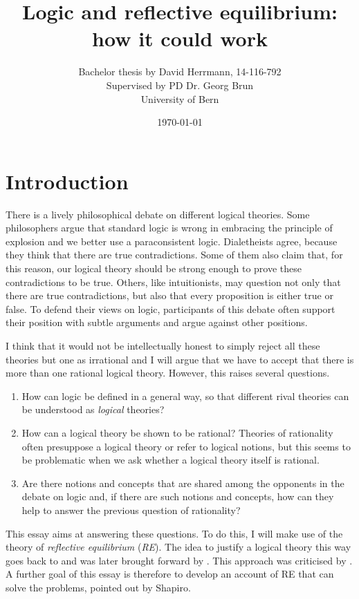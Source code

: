 \documentclass{article}
\title{Logic and reflective equilibrium: how it could work}
\author{Bachelor thesis by David Herrmann, 14-116-792\\Supervised by PD Dr. Georg Brun\\University of Bern}
\date{\today}
\begin{document}
\maketitle
\section{Introduction}
There is a lively philosophical debate on different logical theories. Some philosophers argue that standard logic is wrong in embracing the principle of explosion and we better use a paraconsistent logic. Dialetheists agree, because they think that there are true contradictions. Some of them also claim that, for this reason, our logical theory should be strong enough to prove these contradictions to be true. Others, like intuitionists, may question not only that there are true contradictions, but also that every proposition is either true or false. To defend their views on logic, participants of this debate often support their position with subtle arguments and argue against other positions.

I think that it would not be intellectually honest to simply reject all these theories but one as irrational and I will argue that we have to accept that there is more than one rational logical theory. However, this raises several questions.

\begin{enumerate}
    \item How can logic be defined in a general way, so that different rival theories can be understood as \textit{logical} theories?
    \item How can a logical theory be shown to be rational? Theories of rationality often presuppose a logical theory or refer to logical notions, but this seems to be problematic when we ask whether a logical theory itself is rational.
    \item Are there notions and concepts that are shared among the opponents in the debate on logic and, if there are such notions and concepts, how can they help to answer the previous question of rationality?
\end{enumerate}

This essay aims at answering these questions. To do this, I will make use of the theory of \textit{reflective equilibrium} (\textit{RE}). The idea to justify a logical theory this way goes back to  and was later brought forward by . This approach was criticised by . A further goal of this essay is therefore to develop an account of RE that can solve the problems, pointed out by Shapiro.
\end{document}

